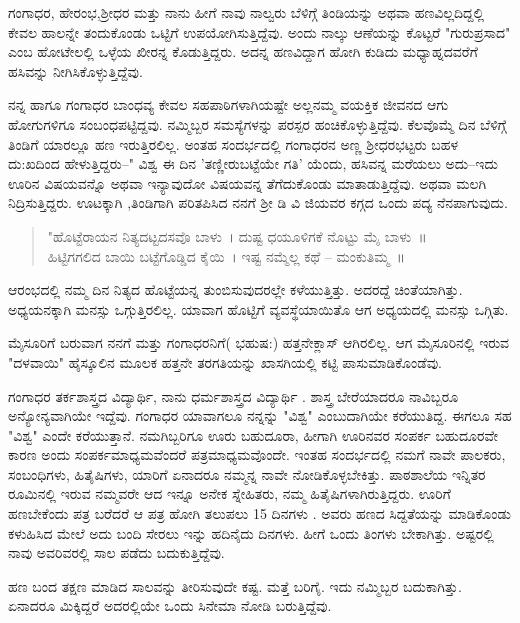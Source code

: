 ಗಂಗಾಧರ, ಹೇರಂಭ,ಶ್ರೀಧರ ಮತ್ತು ನಾನು ಹೀಗೆ ನಾವು ನಾಲ್ವರು ಬೆಳಿಗ್ಗೆ ತಿಂಡಿಯನ್ನು ಅಥವಾ ಹಣವಿಲ್ಲದಿದ್ದಲ್ಲಿ ಕೇವಲ   ಹಾಲನ್ನೇ ತಂದುಕೊಂಡು ಒಟ್ಟಿಗೆ ಉಪಯೋಗಿಸುತ್ತಿದ್ದೆವು. ಅಂದು ನಾಲ್ಕು ಆಣೆಯನ್ನು ಕೊಟ್ಟರೆ "ಗುರುಪ್ರಸಾದ" ಎಂಬ ಹೋಟೇಲಲ್ಲಿ  ಒಳ್ಳೆಯ ಖೀರನ್ನ ಕೊಡುತ್ತಿದ್ದರು. ಅದನ್ನ ಹಣವಿದ್ದಾಗ ಹೋಗಿ ಕುಡಿದು ಮಧ್ಯಾಹ್ನದವರೆಗೆ ಹಸಿವನ್ನು ನೀಗಿಸಿಕೊಳ್ಳುತ್ತಿದ್ದೆವು. 

ನನ್ನ ಹಾಗೂ ಗಂಗಾಧರ ಬಾಂಧವ್ಯ ಕೇವಲ ಸಹಪಾಠಿಗಳಾಗಿಯಷ್ಟೇ ಅಲ್ಲನಮ್ಮ ವಯಕ್ತಿಕ ಜೀವನದ ಆಗು ಹೋಗುಗಳಿಗೂ  ಸಂಬಂಧಪಟ್ಟಿದ್ದವು. ನಮ್ಮಿಬ್ಬರ ಸಮಸ್ಯೆಗಳನ್ನು ಪರಸ್ಪರ ಹಂಚಿಕೊಳ್ಳುತ್ತಿದ್ದೆವು. ಕೆಲವೊಮ್ಮೆ ದಿನ ಬೆಳಿಗ್ಗೆ ತಿಂಡಿಗೆ ಯಾರಲ್ಲೂ ಹಣ ಇರುತ್ತಿರಲಿಲ್ಲ. ಅಂತಹ ಸಂದರ್ಭದಲ್ಲಿ ಗಂಗಾಧರನ ಅಣ್ಣ ಶ್ರೀಧರಭಟ್ಟರು ಬಹಳ ದು:ಖದಿಂದ ಹೇಳುತ್ತಿದ್ದರು–" ವಿಶ್ವ ಈ ದಿನ 'ತಣ್ಣೀರುಬಟ್ಟೆಯೇ ಗತಿ' ಯೆಂದು, ಹಸಿವನ್ನ ಮರೆಯಲು ಅದು–ಇದು ಊರಿನ ವಿಷಯವನ್ನೊ ಅಥವಾ ಇನ್ಯಾವುದೋ ವಿಷಯವನ್ನ ತೆಗೆದುಕೊಂಡು ಮಾತಾಡುತ್ತಿದ್ದೆವು. ಅಥವಾ ಮಲಗಿ ನಿದ್ರಿಸುತ್ತಿದ್ದರು. ಊಟಕ್ಕಾಗಿ ,ತಿಂಡಿಗಾಗಿ ಪರಿತಪಿಸಿದ ನನಗೆ ಶ್ರೀ ಡಿ ವಿ ಜಿಯವರ ಕಗ್ಗದ ಒಂದು ಪದ್ಯ ನೆನಪಾಗುವುದು. 

\begin{verse}
"ಹೊಟ್ಟೆರಾಯನ ನಿತ್ಯದಟ್ಟದಸವೊ ಬಾಳು~। ದುಷ್ಟ ಧಯೂಳಿಗಕೆ ನೊಟ್ಟು ಮೈ ಬಾಳು~॥ \\
ಹಿಟ್ಟಿಗಗಲಿದ ಬಾಯಿ ಬಟ್ಟೆಗೊಡ್ಡಿದ ಕೈಯಿ~। ಇಷ್ಟ ನಮ್ಮೆಲ್ಲ  ಕಥೆ – ಮಂಕುತಿಮ್ಮ~॥ 
\end{verse}

ಆರಂಭದಲ್ಲಿ ನಮ್ಮ ದಿನ ನಿತ್ಯದ ಹೊಟ್ಟೆಯನ್ನ ತುಂಬಿಸುವುದರಲ್ಲೇ ಕಳೆಯುತ್ತಿತ್ತು. ಅದರದ್ದೆ ಚಿಂತೆಯಾಗಿತ್ತು.  ಅಧ್ಯಯನಕ್ಕಾಗಿ ಮನಸ್ಸು ಒಗ್ಗುತ್ತಿರಲಿಲ್ಲ. ಯಾವಾಗ ಹೊಟ್ಟಿಗೆ  ವ್ಯವಸ್ಥೆಯಾಯಿತೊ ಆಗ ಅಧ್ಯಯದಲ್ಲಿ ಮನಸ್ಸು  ಒಗ್ಗಿತು. 

ಮೈಸೂರಿಗೆ ಬರುವಾಗ ನನಗೆ ಮತ್ತು ಗಂಗಾಧರನಿಗೆ( ಭಹುಷ:) ಹತ್ತನೇಕ್ಲಾಸ್ ಆಗಿರಲಿಲ್ಲ. ಆಗ ಮೈಸೂರಿನಲ್ಲಿ ಇರುವ "ದಳವಾಯಿ" ಹೈಸ್ಕೂಲಿನ ಮೂಲಕ ಹತ್ತನೇ ತರಗತಿಯನ್ನು ಖಾಸಗಿಯಲ್ಲಿ ಕಟ್ಟಿ ಪಾಸುಮಾಡಿಕೊಂಡೆವು. 

ಗಂಗಾಧರ ತರ್ಕಶಾಸ್ತ್ರದ ವಿದ್ಯಾರ್ಥಿ, ನಾನು ಧರ್ಮಶಾಸ್ತ್ರದ ವಿದ್ಯಾರ್ಥಿ . ಶಾಸ್ತ್ರ ಬೇರೆಯಾದರೂ ನಾವಿಬ್ಬರೂ ಅನ್ಯೋನ್ಯವಾಗಿಯೇ ಇದ್ದೆವು. ಗಂಗಾಧರ ಯಾವಾಗಲೂ ನನ್ನನ್ನು "ವಿಶ್ವ" ಎಂಬುದಾಗಿಯೇ ಕರೆಯುತಿದ್ದ. ಈಗಲೂ ಸಹ "ವಿಶ್ವ" ಎಂದೇ ಕರೆಯುತ್ತಾನೆ. ನಮಗಿಬ್ಬರಿಗೂ ಊರು ಬಹುದೂರಾ, ಹೀಗಾಗಿ ಊರಿನವರ ಸಂಪರ್ಕ ಬಹುದೂರವೇ ಕಾರಣ ಅಂದು  ಸಂಪರ್ಕಮಾಧ್ಯಮವೆಂದರೆ ಪತ್ರಮಾಧ್ಯಮವೊಂದೇ. ಇಂತಹ ಸಂದರ್ಭದಲ್ಲಿ ನಮಗೆ ನಾವೇ ಪಾಲಕರು, ಸಂಬಂಧಿಗಳು, ಹಿತೈಷಿಗಳು, ಯಾರಿಗೆ ಏನಾದರೂ ನಮ್ಮನ್ನ  ನಾವೇ ನೋಡಿಕೊಳ್ಳಬೇಕಿತ್ತು.  ಪಾಠಶಾಲೆಯ ಇನ್ನಿತರ  ರೂಮಿನಲ್ಲಿ  ಇರುವ ನಮ್ಮವರೇ ಆದ ಇನ್ನೂ ಅನೇಕ ಸ್ನೇಹಿತರು, ನಮ್ಮ ಹಿತೈಷಿಗಳಾಗಿರುತ್ತಿದ್ದರು.  ಊರಿಗೆ ಹಣಬೇಕೆಂದು ಪತ್ರ ಬರೆದರೆ ಆ ಪತ್ರ ಹೋಗಿ ತಲುಪಲು 15 ದಿನಗಳು . ಅವರು ಹಣದ ಸಿದ್ದತೆಯನ್ನು ಮಾಡಿಕೊಂಡು  ಕಳುಹಿಸಿದ ಮೇಲೆ ಅದು ಬಂದಿ ಸೇರಲು ಇನ್ನು ಹದಿನೈದು    ದಿನಗಳು. ಹೀಗೆ ಒಂದು ತಿಂಗಳು ಬೇಕಾಗಿತ್ತು.  ಅಷ್ಟರಲ್ಲಿ ನಾವು ಅವರಿವರಲ್ಲಿ ಸಾಲ ಪಡೆದು ಬದುಕುತ್ತಿದ್ದೆವು. 

ಹಣ ಬಂದ ತಕ್ಷಣ ಮಾಡಿದ ಸಾಲವನ್ನು ತೀರಿಸುವುದೇ ಕಷ್ಟ. ಮತ್ತೆ ಬರಿಗೈ. ಇದು ನಮ್ಮಿಬ್ಬರ ಬದುಕಾಗಿತ್ತು. ಏನಾದರೂ ಮಿಕ್ಕಿದ್ದರೆ ಅದರಲ್ಲಿಯೇ ಒಂದು ಸಿನೇಮಾ ನೋಡಿ ಬರುತ್ತಿದ್ದೆವು. 

